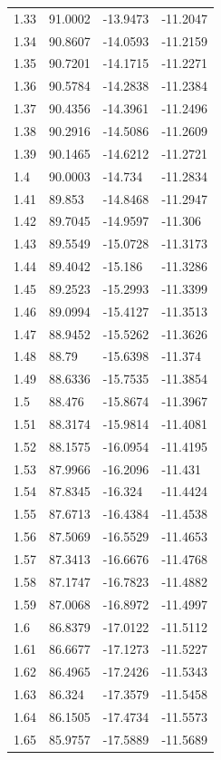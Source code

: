 \begin{tabular}{llll}
1.33 & 91.0002 & -13.9473 & -11.2047 \\
1.34 & 90.8607 & -14.0593 & -11.2159 \\
1.35 & 90.7201 & -14.1715 & -11.2271 \\
1.36 & 90.5784 & -14.2838 & -11.2384 \\
1.37 & 90.4356 & -14.3961 & -11.2496 \\
1.38 & 90.2916 & -14.5086 & -11.2609 \\
1.39 & 90.1465 & -14.6212 & -11.2721 \\
1.4 & 90.0003 & -14.734 & -11.2834 \\
1.41 & 89.853 & -14.8468 & -11.2947 \\
1.42 & 89.7045 & -14.9597 & -11.306 \\
1.43 & 89.5549 & -15.0728 & -11.3173 \\
1.44 & 89.4042 & -15.186 & -11.3286 \\
1.45 & 89.2523 & -15.2993 & -11.3399 \\
1.46 & 89.0994 & -15.4127 & -11.3513 \\
1.47 & 88.9452 & -15.5262 & -11.3626 \\
1.48 & 88.79 & -15.6398 & -11.374 \\
1.49 & 88.6336 & -15.7535 & -11.3854 \\
1.5 & 88.476 & -15.8674 & -11.3967 \\
1.51 & 88.3174 & -15.9814 & -11.4081 \\
1.52 & 88.1575 & -16.0954 & -11.4195 \\
1.53 & 87.9966 & -16.2096 & -11.431 \\
1.54 & 87.8345 & -16.324 & -11.4424 \\
1.55 & 87.6713 & -16.4384 & -11.4538 \\
1.56 & 87.5069 & -16.5529 & -11.4653 \\
1.57 & 87.3413 & -16.6676 & -11.4768 \\
1.58 & 87.1747 & -16.7823 & -11.4882 \\
1.59 & 87.0068 & -16.8972 & -11.4997 \\
1.6 & 86.8379 & -17.0122 & -11.5112 \\
1.61 & 86.6677 & -17.1273 & -11.5227 \\
1.62 & 86.4965 & -17.2426 & -11.5343 \\
1.63 & 86.324 & -17.3579 & -11.5458 \\
1.64 & 86.1505 & -17.4734 & -11.5573 \\
1.65 & 85.9757 & -17.5889 & -11.5689 \\

\end{tabular}
